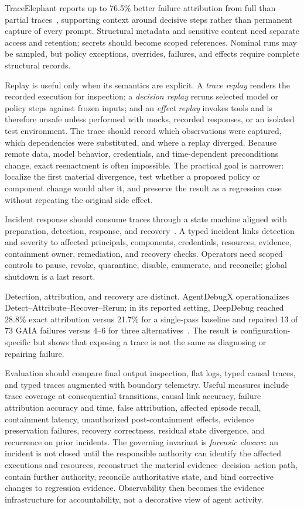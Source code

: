 TraceElephant reports up to 76.5\% better failure attribution from full than partial traces~\cite{chen2026traceelephant}, supporting context around decisive steps rather than permanent capture of every prompt. Structural metadata and sensitive content need separate access and retention; secrets should become scoped references. Nominal runs may be sampled, but policy exceptions, overrides, failures, and effects require complete structural records.

Replay is useful only when its semantics are explicit. A \emph{trace replay} renders the recorded execution for inspection; a \emph{decision replay} reruns selected model or policy steps against frozen inputs; and an \emph{effect replay} invokes tools and is therefore unsafe unless performed with mocks, recorded responses, or an isolated test environment. The trace should record which observations were captured, which dependencies were substituted, and where a replay diverged. Because remote data, model behavior, credentials, and time-dependent preconditions change, exact reenactment is often impossible. The practical goal is narrower: localize the first material divergence, test whether a proposed policy or component change would alter it, and preserve the result as a regression case without repeating the original side effect.

Incident response should consume traces through a state machine aligned with preparation, detection, response, and recovery~\cite{nist2025incidentresponse}. A typed incident links detection and severity to affected principals, components, credentials, resources, evidence, containment owner, remediation, and recovery checks. Operators need scoped controls to pause, revoke, quarantine, disable, enumerate, and reconcile; global shutdown is a last resort.

Detection, attribution, and recovery are distinct. AgentDebugX operationalizes Detect--Attribute--Recover--Rerun; in its reported setting, DeepDebug reached 28.8\% exact attribution versus 21.7\% for a single-pass baseline and repaired 13 of 73 GAIA failures versus 4--6 for three alternatives~\cite{zhu2026agentdebugx}. The result is configuration-specific but shows that exposing a trace is not the same as diagnosing or repairing failure.

Evaluation should compare final output inspection, flat logs, typed causal traces, and typed traces augmented with boundary telemetry. Useful measures include trace coverage at consequential transitions, causal link accuracy, failure attribution accuracy and time, false attribution, affected episode recall, containment latency, unauthorized post-containment effects, evidence preservation failures, recovery correctness, residual state divergence, and recurrence on prior incidents. The governing invariant is \emph{forensic closure}: an incident is not closed until the responsible authority can identify the affected executions and resources, reconstruct the material evidence--decision--action path, contain further authority, reconcile authoritative state, and bind corrective changes to regression evidence. Observability then becomes the evidence infrastructure for accountability, not a decorative view of agent activity.

